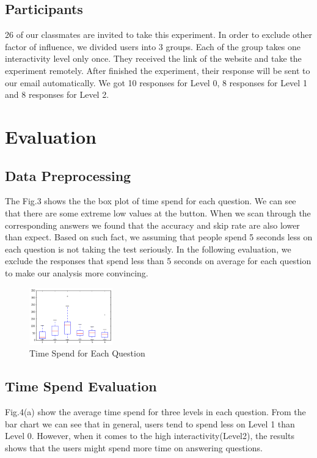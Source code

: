 \documentclass[9pt,journal,compsoc]{IEEEtran}
\begin{document}
\subsection{Participants}
26 of our classmates are invited to take this experiment. In order to exclude other factor of influence, we divided users into 3 groups. Each of the group takes one interactivity level only once. They received the link of the website and take the experiment remotely. After finished the experiment, their response will be sent to our email automatically. We got 10 responses for Level 0, 8 responses for Level 1 and 8 responses for Level 2.

\section{Evaluation}
\large
\subsection{Data Preprocessing}
The Fig.3 shows the the box plot of time spend for each question. We can see that there are some extreme low values at the button. When we scan through the corresponding answers we found that the accuracy and skip rate are also lower than expect. Based on such fact, we assuming that people spend 5 seconds less on each question is not taking the test seriously. In the following evaluation, we exclude the responses that spend less than 5 seconds on average for each question to make our analysis more convincing.
\begin{figure} [H]
  \centering
  \includegraphics[width=0.32\textwidth]{TimeSpendBox.PNG}
  \caption{Time Spend for Each Question}
  \label{fig:6}
\end{figure}
\subsection{Time Spend Evaluation}
Fig.4(a) show the average time spend for three levels in each question. From the bar chart we can see that in general, users tend to spend less on Level 1 than Level 0. However, when it comes to the high interactivity(Level2), the results shows that the users might spend more time on answering questions.
\end{document}
